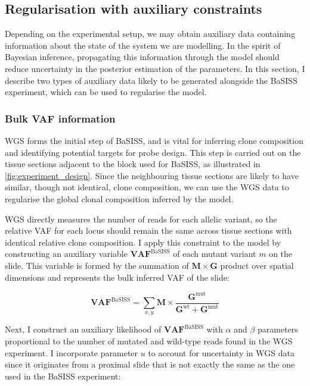 \subsection{Regularisation with auxiliary constraints}
Depending on the experimental setup, we may obtain auxiliary data containing information about the state of the system we are modelling. In the spirit of Bayesian inference, propagating this information through the model should reduce uncertainty in the posterior estimation of the parameters. In this section, I describe two types of auxiliary data likely to be generated alongside the \ac{BaSISS} experiment, which can be used to regularise the model.

\subsubsection*{Bulk \acl{VAF} information}

\ac{WGS} forms the initial step of \ac{BaSISS}, and is vital for inferring clone composition and identifying potential targets for probe design. This step is carried out on the tissue sections adjacent to the block used for \ac{BaSISS}, as illustrated in \cref{fig:experiment_design}. Since the neighbouring tissue sections are likely to have similar, though not identical, clone composition, we can use the \ac{WGS} data to regularise the global clonal composition inferred by the model.

\ac{WGS} directly measures the number of reads for each allelic variant, so the relative \acf{VAF} for each locus should remain the same across tissue sections with identical relative clone composition. I apply this constraint to the model by constructing an auxiliary variable $\mathbf{VAF}^{\text{BaSISS}}$ of each mutant variant $m$ on the slide. This variable is formed by the summation of $\mathbf{M} \times \mathbf{G}$ product over spatial dimensions and represents the bulk inferred \ac{VAF} of the slide:

\begin{equation} 
\mathbf{VAF}^{\text{BaSISS}} = \sum_{x,y} \mathbf{M} \times \dfrac{\mathbf{G}^{\text{mut}}}{\mathbf{G}^{\text{wt}} + \mathbf{G}^{\text{mut}}}
\end{equation}

Next, I construct an auxiliary likelihood of $\mathbf{VAF}^{\text{BaSISS}}$ with $\alpha$ and $\beta$ parameters proportional to the number of mutated and wild-type reads found in the \ac{WGS} experiment. I incorporate parameter $u$ to account for uncertainty in \ac{WGS} data since it originates from a proximal slide that is not exactly the same as the one used in the BaSISS experiment:

